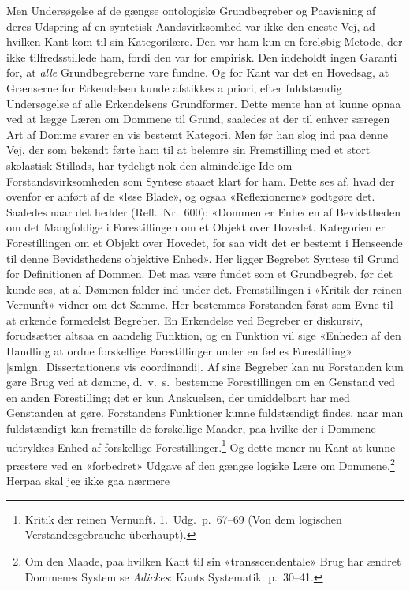 \documentclass[12pt,a4paper]{article}
\newcommand{\apage}[1]{\marginnote{\footnotesize\textit{[#1]}}}
\begin{document}
Men Undersøgelse af de gængse ontologiske Grundbegreber og Paavisning af
deres Udspring af en syntetisk Aandsvirksomhed var ikke den eneste Vej,
ad hvilken Kant kom til sin Kategorilære. Den var ham kun en foreløbig
Metode, der ikke tilfredsstillede ham, fordi den var for empirisk. Den
indeholdt ingen Garanti for, at \emph{alle} Grundbegreberne vare fundne. Og for
Kant var det en Hovedsag, at Grænserne for Erkendelsen kunde afstikkes a
priori, efter fuldstændig Undersøgelse af alle Erkendelsens Grundformer.
Dette mente han at kunne opnaa ved at lægge Læren om Dommene til Grund,
saaledes at der til enhver særegen Art af Domme svarer en vis bestemt
Kategori. Men før han slog ind paa denne Vej, der som bekendt førte ham
til at belemre sin Fremstilling med et stort skolastisk Stillads, har
tydeligt nok den almindelige Ide om Forstandsvirksomheden som Syntese
staaet klart for ham. Dette ses af, hvad der ovenfor er anført af de
«løse Blade», og ogsaa «Reflexionerne» godtgøre det. Saaledes naar det
hedder (Refl.\ Nr.\ 600): «Dommen er Enheden af Bevidstheden om det
Mangfoldige i Forestillingen om et Objekt over Hovedet. Kategorien er
Forestillingen om et Objekt over Hovedet, for saa vidt det er bestemt i
Henseende til denne Bevidsthedens objektive Enhed». Her ligger Begrebet
Syntese til Grund for Definitionen af Dommen. Det maa være fundet som et
Grundbegreb, \apage{55}  før det kunde ses, at al Dømmen falder ind under det.
Fremstillingen i «Kritik der reinen Vernunft» vidner om det Samme. Her
bestemmes Forstanden først som Evne til at erkende formedelst Begreber. En
Erkendelse ved Begreber er diskursiv, forudsætter altsaa en aandelig
Funktion, og en Funktion vil sige «Enheden af den Handling at ordne
forskellige Forestillinger under en fælles Forestilling» [smlgn.\
Dissertationens vis coordinandi]. Af sine Begreber kan nu
Forstanden kun gøre Brug ved at dømme, d.\ v.\ s.\ bestemme Forestillingen
om en Genstand ved en anden Forestilling; det er kun Anskuelsen, der
umiddelbart har med Genstanden at gøre. Forstandens Funktioner kunne fuldstændigt findes, naar man
fuldstændigt kan fremstille de forskellige Maader, paa hvilke der i
Dommene udtrykkes Enhed af forskellige Forestillinger.\footnote{Kritik der reinen
Vernunft. 1.\ Udg.\ p.\ 67--69 (Von dem logischen Verstandesgebrauche
überhaupt).} Og dette mener nu
Kant at kunne præstere ved en «forbedret» Udgave af den gængse logiske
Lære om Dommene.\footnote{Om den Maade, paa hvilken Kant til sin
«transscendentale» Brug har ændret Dommenes System se \emph{Adickes}:
Kants Systematik. p.\ 30--41.} Herpaa skal jeg ikke gaa nærmere
\end{document}
